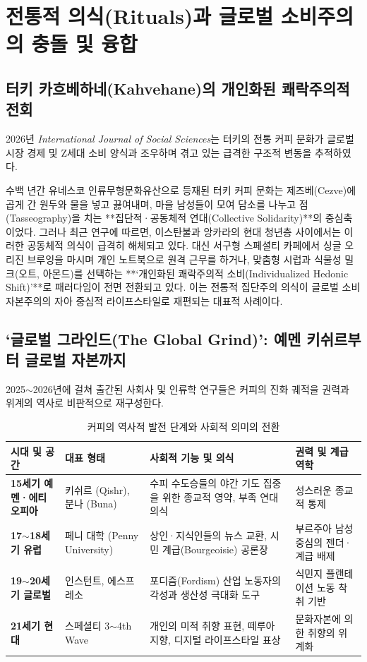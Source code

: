 \documentclass[10pt,a4paper]{article}
\begin{document}
\section{전통적 의식(Rituals)과 글로벌 소비주의의 충돌 및 융합}

\subsection{터키 카흐베하네(Kahvehane)의 개인화된 쾌락주의적 전회}
2026년 \textit{International Journal of Social Sciences}는 터키의 전통 커피 문화가 글로벌 시장 경제 및 Z세대 소비 양식과 조우하며 겪고 있는 급격한 구조적 변동을 추적하였다.

수백 년간 유네스코 인류무형문화유산으로 등재된 터키 커피 문화는 제즈베(Cezve)에 곱게 간 원두와 물을 넣고 끓여내며, 마을 남성들이 모여 담소를 나누고 점(Tasseography)을 치는 **집단적·공동체적 연대(Collective Solidarity)**의 중심축이었다. 
그러나 최근 연구에 따르면, 이스탄불과 앙카라의 현대 청년층 사이에서는 이러한 공동체적 의식이 급격히 해체되고 있다. 대신 서구형 스페셜티 카페에서 싱글 오리진 브루잉을 마시며 개인 노트북으로 원격 근무를 하거나, 맞춤형 시럽과 식물성 밀크(오트, 아몬드)를 선택하는 **‘개인화된 쾌락주의적 소비(Individualized Hedonic Shift)’**로 패러다임이 전면 전환되고 있다. 이는 전통적 집단주의 의식이 글로벌 소비 자본주의의 자아 중심적 라이프스타일로 재편되는 대표적 사례이다.

\subsection{‘글로벌 그라인드(The Global Grind)’: 예멘 키쉬르부터 글로벌 자본까지}
2025$\sim$2026년에 걸쳐 출간된 사회사 및 인류학 연구들은 커피의 진화 궤적을 권력과 위계의 역사로 비판적으로 재구성한다.

\begin{table}[h!]
\centering
\small
\caption{커피의 역사적 발전 단계와 사회적 의미의 전환}
\vspace{4pt}
\begin{tabularx}{\textwidth}{llp{7.5cm}X}
\toprule
\textbf{시대 및 공간} & \textbf{대표 형태} & \textbf{사회적 기능 및 의식} & \textbf{권력 및 계급 역학} \\
\midrule
\textbf{15세기 예멘·에티오피아} & 키쉬르 (Qishr), 분나 (Buna) & 수피 수도승들의 야간 기도 집중을 위한 종교적 영약, 부족 연대 의식 & 성스러운 종교적 통제 \\
\textbf{17$\sim$18세기 유럽} & 페니 대학 (Penny University) & 상인·지식인들의 뉴스 교환, 시민 계급(Bourgeoisie) 공론장 & 부르주아 남성 중심의 젠더·계급 배제 \\
\textbf{19$\sim$20세기 글로벌} & 인스턴트, 에스프레소 & 포디즘(Fordism) 산업 노동자의 각성과 생산성 극대화 도구 & 식민지 플랜테이션 노동 착취 기반 \\
\textbf{21세기 현대} & 스페셜티 3$\sim$4th Wave & 개인의 미적 취향 표현, 떼루아 지향, 디지털 라이프스타일 표상 & 문화자본에 의한 취향의 위계화 \\
\bottomrule
\end{tabularx}
\end{table}
\end{document}

